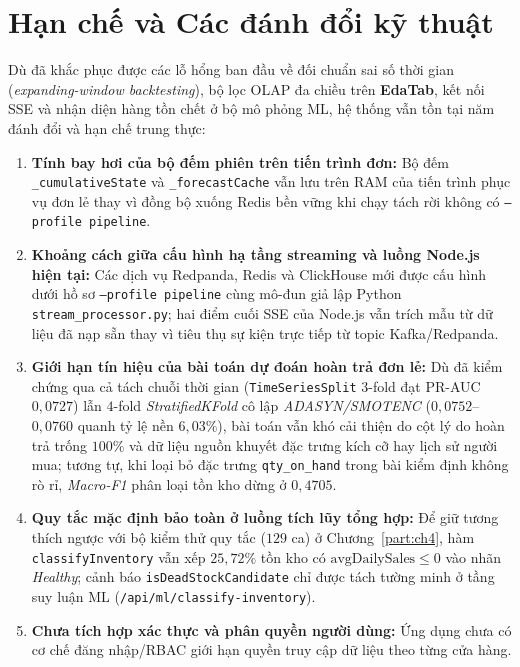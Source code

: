 \section{Hạn chế và Các đánh đổi kỹ thuật}
\label{sec:ch6-tradeoffs}
Dù đã khắc phục được các lỗ hổng ban đầu về đối chuẩn sai số thời gian (\textit{expanding-window backtesting}), bộ lọc OLAP đa chiều trên \textbf{EdaTab}, kết nối SSE và nhận diện hàng tồn chết ở bộ mô phỏng ML, hệ thống vẫn tồn tại năm đánh đổi và hạn chế trung thực:
\begin{enumerate}[label=\textit{\arabic*},topsep=0pt, itemsep=1pt]
	\item \textbf{Tính bay hơi của bộ đếm phiên trên tiến trình đơn:} Bộ đếm \texttt{_cumulativeState} và \texttt{_forecastCache} vẫn lưu trên RAM của tiến trình phục vụ đơn lẻ thay vì đồng bộ xuống Redis bền vững khi chạy tách rời không có \texttt{--profile pipeline}.
	\item \textbf{Khoảng cách giữa cấu hình hạ tầng streaming và luồng Node.js hiện tại:} Các dịch vụ Redpanda, Redis và ClickHouse mới được cấu hình dưới hồ sơ \texttt{--profile pipeline} cùng mô-đun giả lập Python \texttt{stream_processor.py}; hai điểm cuối SSE của Node.js vẫn trích mẫu từ dữ liệu đã nạp sẵn thay vì tiêu thụ sự kiện trực tiếp từ topic Kafka/Redpanda.
	\item \textbf{Giới hạn tín hiệu của bài toán dự đoán hoàn trả đơn lẻ:} Dù đã kiểm chứng qua cả tách chuỗi thời gian (\texttt{TimeSeriesSplit} $3$-fold đạt PR-AUC $0{,}0727$) lẫn $4$-fold \textit{StratifiedKFold} cô lập \textit{ADASYN/SMOTENC} ($0{,}0752$--$0{,}0760$ quanh tỷ lệ nền $6{,}03\%$), bài toán vẫn khó cải thiện do cột lý do hoàn trả trống $100\%$ và dữ liệu nguồn khuyết đặc trưng kích cỡ hay lịch sử người mua; tương tự, khi loại bỏ đặc trưng \texttt{qty_on_hand} trong bài kiểm định không rò rỉ, \textit{Macro-F1} phân loại tồn kho dừng ở $0{,}4705$.
	\item \textbf{Quy tắc mặc định bảo toàn ở luồng tích lũy tổng hợp:} Để giữ tương thích ngược với bộ kiểm thử quy tắc ($129$ ca) ở Chương~\ref{part:ch4}, hàm \texttt{classifyInventory} vẫn xếp $25{,}72\%$ tồn kho có $\text{avgDailySales} \le 0$ vào nhãn \textit{Healthy}; cảnh báo \texttt{isDeadStockCandidate} chỉ được tách tường minh ở tầng suy luận ML (\texttt{/api/ml/classify-inventory}).
	\item \textbf{Chưa tích hợp xác thực và phân quyền người dùng:} Ứng dụng chưa có cơ chế đăng nhập/RBAC giới hạn quyền truy cập dữ liệu theo từng cửa hàng.
\end{enumerate}

